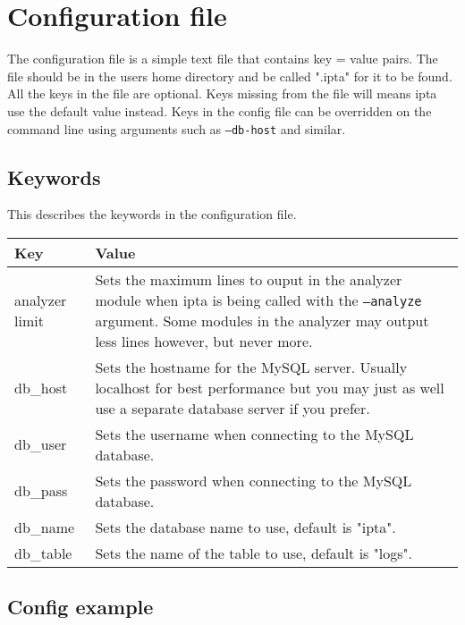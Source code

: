 \documentclass[english,twoside,openright,a4paper,12pt]{article}
\begin{document}
\section{Configuration file}

The configuration file is a simple text file that contains key = value pairs. The file should be in the users home directory and be called ".ipta" for it to be found. All the keys in the file are optional. Keys missing from the file will means ipta use the default value instead. Keys in the config file can be overridden on the command line using arguments such as \texttt{--db-host} and similar.

\subsection{Keywords}

This describes the keywords in the configuration file.

\begin{longtable}{|p{}|p{}|}
\hline
Key & Value\\
\hline
analyzer limit & Sets the maximum lines to ouput in the analyzer module when ipta is being called with the \texttt{--analyze} argument. Some modules in the analyzer may output less lines however, but never more.\\ \hline

db\_host & Sets the hostname for the MySQL server. Usually localhost for best performance but you may just as well use a separate database server if you prefer.\\\hline

db\_user & Sets the username when connecting to the MySQL database.\\\hline

db\_pass & Sets the password when connecting to the MySQL database.\\\hline

db\_name & Sets the database name to use, default is "ipta".\\\hline

db\_table & Sets the name of the table to use, default is "logs".\\\hline
\end{longtable}

\subsection{Config example}
\end{document}
